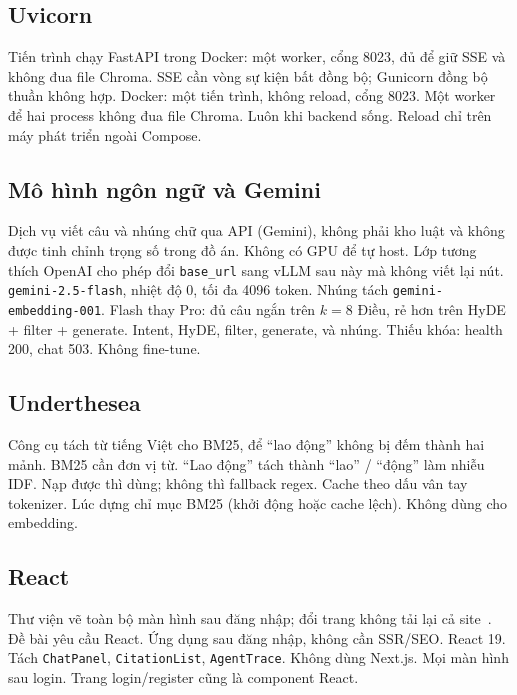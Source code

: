 \subsection{Uvicorn}

\boncau
{Tiến trình chạy FastAPI trong Docker: một worker, cổng 8023, đủ để giữ SSE và
không đua file Chroma.}
{SSE cần vòng sự kiện bất đồng bộ; Gunicorn đồng bộ thuần không hợp.}
{Docker: một tiến trình, không reload, cổng 8023. Một worker để hai process
không đua file Chroma.}
{Luôn khi backend sống. Reload chỉ trên máy phát triển ngoài Compose.}

\subsection{Mô hình ngôn ngữ và Gemini}

\boncau
{Dịch vụ viết câu và nhúng chữ qua API (Gemini), không phải kho luật và không
được tinh chỉnh trọng số trong đồ án.}
{Không có GPU để tự host. Lớp tương thích OpenAI cho phép đổi \texttt{base\_url}
sang vLLM sau này mà không viết lại nút.}
{\texttt{gemini-2.5-flash}, nhiệt độ 0, tối đa 4096 token. Nhúng tách
\texttt{gemini-embedding-001}. Flash thay Pro: đủ câu ngắn trên $k=8$ Điều, rẻ
hơn trên HyDE + filter + generate.}
{Intent, HyDE, filter, generate, và nhúng. Thiếu khóa: health 200, chat 503.
Không fine-tune.}

\subsection{Underthesea}

\boncau
{Công cụ tách từ tiếng Việt cho BM25, để ``lao động'' không bị đếm thành hai
mảnh.}
{BM25 cần đơn vị từ. ``Lao động'' tách thành ``lao'' / ``động'' làm nhiễu IDF.}
{Nạp được thì dùng; không thì fallback regex. Cache theo dấu vân tay tokenizer.}
{Lúc dựng chỉ mục BM25 (khởi động hoặc cache lệch). Không dùng cho embedding.}

\subsection{React}

\boncau
{Thư viện vẽ toàn bộ màn hình sau đăng nhập; đổi trang không tải lại cả
site~\cite{react}.}
{Đề bài yêu cầu React. Ứng dụng sau đăng nhập, không cần SSR/SEO.}
{React 19. Tách \texttt{ChatPanel}, \texttt{CitationList}, \texttt{AgentTrace}.
Không dùng Next.js.}
{Mọi màn hình sau login. Trang login/register cũng là component React.}

